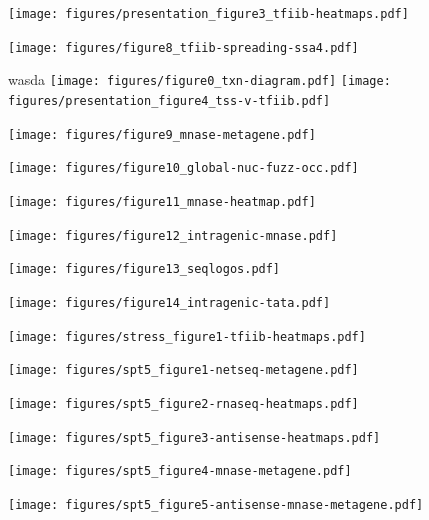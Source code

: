 \documentclass[aspectratio=169]{beamer}
\begin{document}
\begin{frame}
\centering
\texttt{[image: figures/presentation\_figure3\_tfiib-heatmaps.pdf]}
\end{frame}

\begin{frame}
\texttt{[image: figures/figure8\_tfiib-spreading-ssa4.pdf]}
\end{frame}

\begin{frame}{wasda}
    \centering
    \texttt{[image: figures/figure0\_txn-diagram.pdf]}
    \texttt{[image: figures/presentation\_figure4\_tss-v-tfiib.pdf]}
\end{frame}

\begin{frame}
\texttt{[image: figures/figure9\_mnase-metagene.pdf]}
\end{frame}

\begin{frame}
\texttt{[image: figures/figure10\_global-nuc-fuzz-occ.pdf]}
\end{frame}

\begin{frame}
\texttt{[image: figures/figure11\_mnase-heatmap.pdf]}
\end{frame}

\begin{frame}
\texttt{[image: figures/figure12\_intragenic-mnase.pdf]}
\end{frame}

\begin{frame}
\texttt{[image: figures/figure13\_seqlogos.pdf]}
\end{frame}

\begin{frame}
\texttt{[image: figures/figure14\_intragenic-tata.pdf]}
\end{frame}

\begin{frame}
\texttt{[image: figures/stress\_figure1-tfiib-heatmaps.pdf]}
\end{frame}

\begin{frame}
\texttt{[image: figures/spt5\_figure1-netseq-metagene.pdf]}
\end{frame}

\begin{frame}
\texttt{[image: figures/spt5\_figure2-rnaseq-heatmaps.pdf]}
\end{frame}

\begin{frame}
\texttt{[image: figures/spt5\_figure3-antisense-heatmaps.pdf]}
\end{frame}

\begin{frame}
\texttt{[image: figures/spt5\_figure4-mnase-metagene.pdf]}
\end{frame}

\begin{frame}
\texttt{[image: figures/spt5\_figure5-antisense-mnase-metagene.pdf]}
\end{frame}
\end{document}
